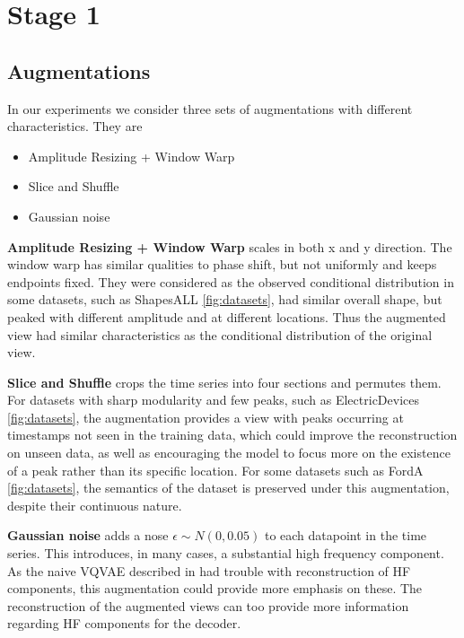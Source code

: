 \documentclass[../../thesis.tex]{subfiles}
\begin{document}
\section{Stage 1}

\subsection{Augmentations}
In our experiments we consider three sets of augmentations with different characteristics. They are
\begin{itemize}
    \item Amplitude Resizing + Window Warp
    \item Slice and Shuffle
    \item Gaussian noise
\end{itemize}

\textbf{Amplitude Resizing + Window Warp} scales in both x and y direction. The window warp has similar qualities to phase shift, but not uniformly and keeps endpoints fixed. They were considered as the observed conditional distribution in some datasets, such as ShapesALL \ref{fig:datasets}, had similar overall shape, but peaked with different amplitude and at different locations. Thus the augmented view had similar characteristics as the conditional distribution of the original view. \newline

\textbf{Slice and Shuffle} crops the time series into four sections and permutes them. For datasets with sharp modularity and few peaks, such as ElectricDevices \ref{fig:datasets}, the augmentation provides a view with peaks occurring at timestamps not seen in the training data, which could improve the reconstruction on unseen data, as well as encouraging the model to focus more on the existence of a peak rather than its specific location. For some datasets such as FordA \ref{fig:datasets}, the semantics of the dataset is preserved under this augmentation, despite their continuous nature.\newline

\textbf{Gaussian noise} adds a nose $\epsilon \sim N(0,0.05)$ to each datapoint in the time series. This introduces, in many cases, a substantial high frequency component. As the naive VQVAE described in \cite{TimeVQVAE} had trouble with reconstruction of HF components, this augmentation could provide more emphasis on these. The reconstruction of the augmented views can too provide more information regarding HF components for the decoder.
\end{document}
